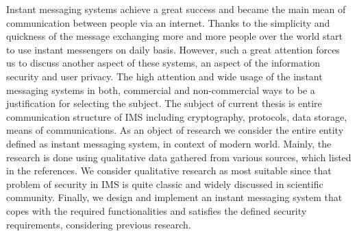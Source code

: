 Instant messaging systems achieve a great success and became the main mean of communication
between people via an internet.
Thanks to the simplicity and quickness of the message exchanging more and more people over the world start to use
instant messengers on daily basis.
However, such a great attention forces us to discuss another aspect of these systems, an aspect of the
information security and user privacy.
The high attention and wide usage of the instant messaging systems in both, commercial and non-commercial ways to be
a justification for selecting the subject.
The subject of current thesis is entire communication structure of IMS including cryptography, protocols,
data storage, means of communications.
As an object of research we consider the entire entity defined as instant messaging system, in context of modern world.
Mainly, the research is done using qualitative data gathered from various sources, which listed in the references.
We consider qualitative research as most suitable since that problem of security in IMS is quite classic and widely
discussed in scientific community.
Finally, we design and implement an instant messaging system that copes with the required functionalities and satisfies
the defined security requirements, considering previous research.